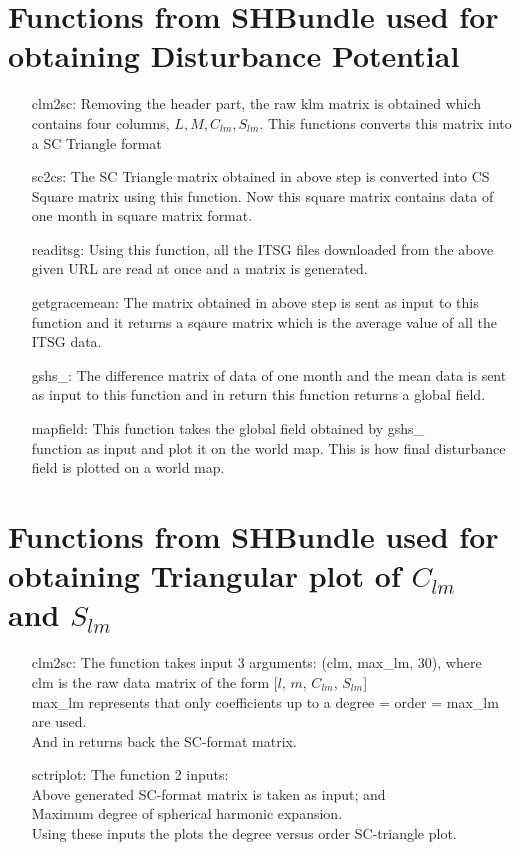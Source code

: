 \documentclass[a4paper,12pt]{report}
\begin{document}
\section{Functions from SHBundle used for obtaining Disturbance Potential}
\begin{itemize}
	\item[clm2sc: ] Removing the header part, the raw 			klm matrix is obtained which contains four columns, $L, 	M, C_{lm}, S_{lm}$. This functions converts this matrix 	into a SC Triangle format
	
	\item[sc2cs: ]The SC Triangle matrix obtained in 			above step is converted into CS Square matrix using 			this function. Now this square matrix contains data of 			one month in square matrix format.
	
	\item[readitsg: ]Using this function, all the ITSG 	files downloaded from the above given URL are read at 			once and a matrix is generated.
	
	\item[getgracemean: ]The matrix obtained in above 			step is sent as input to this function and it returns a 	sqaure matrix which is the average value of all the 			ITSG data.
	
	\item[gshs\_: ]The difference matrix of data of 			one month and the mean data is sent as input to this 			function and in return this function returns a global 			field.
	
	\item[mapfield: ]This function takes the global 			field obtained by gshs\_\\ function as input and plot 			it on the world map. This is how final disturbance 			field is plotted on a world map.
	
\end{itemize}

\section{Functions from SHBundle used for obtaining Triangular plot of $C_{lm}$ and $S_{lm}$}
\begin{itemize}
	\item[clm2sc: ] The function takes input 3 arguments: (clm, max\_{lm}, 30), where\\clm is the raw data matrix of the form [$l$, $m$, $C_{lm}$, $S_{lm}$]\\max\_{lm} represents that only coefficients up to a degree = order = max\_lm are used. \\And in returns back the SC-format matrix.
	\item[sctriplot: ] The function 2 inputs:\\Above generated SC-format matrix is taken as input; and\\Maximum degree of spherical harmonic expansion.\\Using these inputs the plots the degree versus order SC-triangle plot.
\end{itemize}
\end{document}
